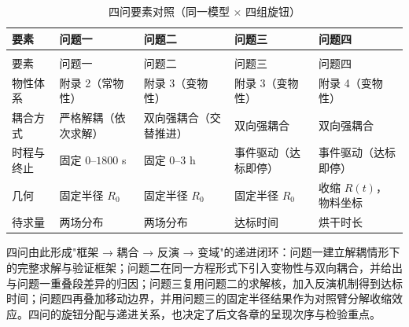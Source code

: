 \begin{longtable}{>{\raggedright\arraybackslash}m{\dimexpr 0.138\tblw\relax}>{\centering\arraybackslash}m{\dimexpr 0.209\tblw\relax}>{\centering\arraybackslash}m{\dimexpr 0.213\tblw\relax}>{\centering\arraybackslash}m{\dimexpr 0.209\tblw\relax}>{\centering\arraybackslash}m{\dimexpr 0.231\tblw\relax}}
  \caption{四问要素对照（同一模型 × 四组旋钮）}\label{tab:2-1}\\
  \toprule
    要素 & 问题一 & 问题二 & 问题三 & 问题四 \\
  \midrule
  \endfirsthead
  \multicolumn{5}{r}{\footnotesize（续）}\\
  \toprule
    要素 & 问题一 & 问题二 & 问题三 & 问题四 \\
  \midrule
  \endhead
  \bottomrule
  \endfoot
  \bottomrule
  \endlastfoot
  物性体系 & 附录 2（常物性） & 附录 3（变物性） & 附录 3（变物性） & 附录 4（变物性） \\
  耦合方式 & 严格解耦（依次求解） & 双向强耦合（交替推进） & 双向强耦合 & 双向强耦合 \\
  时程与终止 & 固定 $0$–$1800$ s & 固定 $0$–$3$ h & 事件驱动（达标即停） & 事件驱动（达标即停） \\
  几何 & 固定半径 $R_0$ & 固定半径 $R_0$ & 固定半径 $R_0$ & 收缩 $R(t)$，物料坐标 \\
  待求量 & 两场分布 & 两场分布 & 达标时间 & 烘干时长 \\
\end{longtable}

四问由此形成"框架 → 耦合 → 反演 → 变域"的递进闭环：问题一建立解耦情形下的完整求解与验证框架；问题二在同一方程形式下引入变物性与双向耦合，并给出与问题一重叠段差异的归因；问题三复用问题二的求解核，加入反演机制得到达标时间；问题四再叠加移动边界，并用问题三的固定半径结果作为对照臂分解收缩效应。四问的旋钮分配与递进关系，也决定了后文各章的呈现次序与检验重点。
